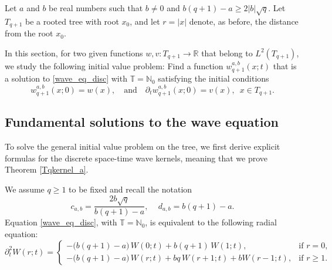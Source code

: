 \documentclass[12pt]{amsart}
\numberwithin{equation}{section}
\theoremstyle{boldremark}
\begin{document}
Let $a$ and $b$ be real numbers such that $b\neq 0$ and $b(q+1)-a\geq 2|b|\sqrt{q}$.  Let $T_{q+1}$ be a rooted tree with root $x_0$, and let  $r=|x|$ denote, as before, the distance from the root $x_0$.

In this section, for two given functions $w, v: T_{q+1}\to\mathbb{R}$ that belong to $L^2(T_{q+1})$, we study the following initial value problem: Find a function $w_{q+1}^{a,b}(x;t)$ that is a solution to  \eqref{wave_eq_disc} with $\mathbb{T}=\mathbb{N}_0$ satisfying the initial conditions
\begin{equation}\label{initial cond general}
w_{q+1}^{a,b}(x;0)=w(x),\quad \text{and}\quad \partial_t w_{q+1}^{a,b}(x;0)= v(x),\,\,\, x\in T_{q+1} .
\end{equation}

\subsection{Fundamental solutions to the wave equation}

To solve the general initial value problem on the tree, we first derive explicit formulas for the discrete space-time wave kernels, meaning that we prove Theorem \ref{Tqkernel_a}.

We assume $q\geq 1$ to be fixed and recall the notation
$$c_{a,b} = \dfrac{2b\sqrt{q}}{b(q+1) - a}, \quad\, d_{a,b}=b(q+1)-a.$$
Equation \eqref{wave_eq_disc}, with $\mathbb{T}=\mathbb{N}_0$, is equivalent to the following radial equation:
\begin{equation}\label{eq. wave on tree}
\partial_t^2 W(r;t) =
\begin{cases}
-\big(b(q+1)-a\big)\,W(0;t) + b(q+1)\,W(1;t), & \text{if } r = 0, \\[6pt]
-\big(b(q+1)-a\big)\,W(r;t) + bq\,W(r+1;t) + bW(r-1;t), & \text{if } r \geq 1.
\end{cases}
\end{equation}
\end{document}
